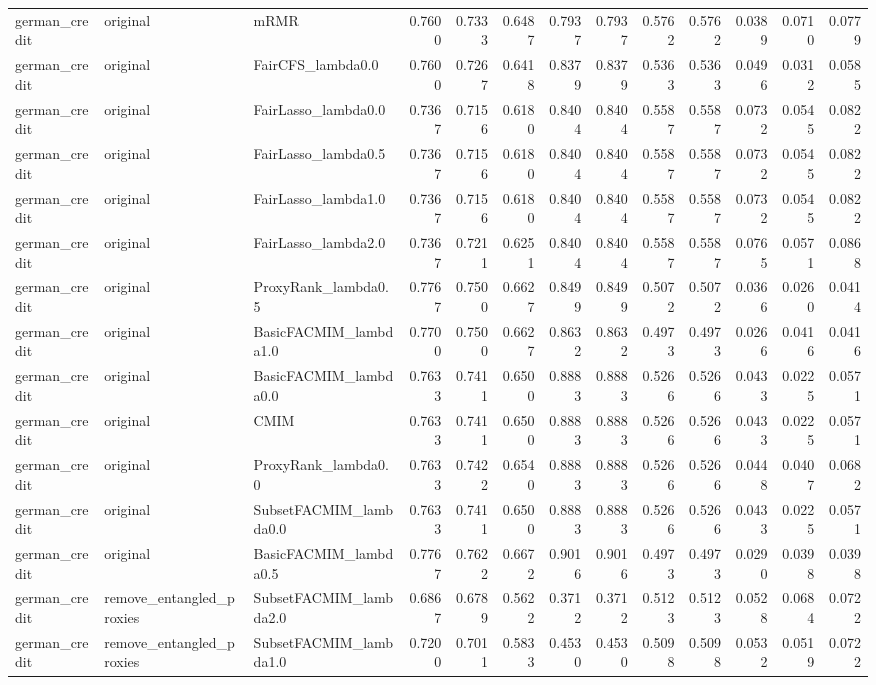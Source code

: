 \begin{tabular}{lllrrrrrrrrrr}
german_credit & original & mRMR & 0.7600 & 0.7333 & 0.6487 & 0.7937 & 0.7937 & 0.5762 & 0.5762 & 0.0389 & 0.0710 & 0.0779 \\
german_credit & original & FairCFS_lambda0.0 & 0.7600 & 0.7267 & 0.6418 & 0.8379 & 0.8379 & 0.5363 & 0.5363 & 0.0496 & 0.0312 & 0.0585 \\
german_credit & original & FairLasso_lambda0.0 & 0.7367 & 0.7156 & 0.6180 & 0.8404 & 0.8404 & 0.5587 & 0.5587 & 0.0732 & 0.0545 & 0.0822 \\
german_credit & original & FairLasso_lambda0.5 & 0.7367 & 0.7156 & 0.6180 & 0.8404 & 0.8404 & 0.5587 & 0.5587 & 0.0732 & 0.0545 & 0.0822 \\
german_credit & original & FairLasso_lambda1.0 & 0.7367 & 0.7156 & 0.6180 & 0.8404 & 0.8404 & 0.5587 & 0.5587 & 0.0732 & 0.0545 & 0.0822 \\
german_credit & original & FairLasso_lambda2.0 & 0.7367 & 0.7211 & 0.6251 & 0.8404 & 0.8404 & 0.5587 & 0.5587 & 0.0765 & 0.0571 & 0.0868 \\
german_credit & original & ProxyRank_lambda0.5 & 0.7767 & 0.7500 & 0.6627 & 0.8499 & 0.8499 & 0.5072 & 0.5072 & 0.0366 & 0.0260 & 0.0414 \\
german_credit & original & BasicFACMIM_lambda1.0 & 0.7700 & 0.7500 & 0.6627 & 0.8632 & 0.8632 & 0.4973 & 0.4973 & 0.0266 & 0.0416 & 0.0416 \\
german_credit & original & BasicFACMIM_lambda0.0 & 0.7633 & 0.7411 & 0.6500 & 0.8883 & 0.8883 & 0.5266 & 0.5266 & 0.0433 & 0.0225 & 0.0571 \\
german_credit & original & CMIM & 0.7633 & 0.7411 & 0.6500 & 0.8883 & 0.8883 & 0.5266 & 0.5266 & 0.0433 & 0.0225 & 0.0571 \\
german_credit & original & ProxyRank_lambda0.0 & 0.7633 & 0.7422 & 0.6540 & 0.8883 & 0.8883 & 0.5266 & 0.5266 & 0.0448 & 0.0407 & 0.0682 \\
german_credit & original & SubsetFACMIM_lambda0.0 & 0.7633 & 0.7411 & 0.6500 & 0.8883 & 0.8883 & 0.5266 & 0.5266 & 0.0433 & 0.0225 & 0.0571 \\
german_credit & original & BasicFACMIM_lambda0.5 & 0.7767 & 0.7622 & 0.6672 & 0.9016 & 0.9016 & 0.4973 & 0.4973 & 0.0290 & 0.0398 & 0.0398 \\
german_credit & remove_entangled_proxies & SubsetFACMIM_lambda2.0 & 0.6867 & 0.6789 & 0.5622 & 0.3712 & 0.3712 & 0.5123 & 0.5123 & 0.0528 & 0.0684 & 0.0722 \\
german_credit & remove_entangled_proxies & SubsetFACMIM_lambda1.0 & 0.7200 & 0.7011 & 0.5833 & 0.4530 & 0.4530 & 0.5098 & 0.5098 & 0.0532 & 0.0519 & 0.0722 \\

\end{tabular}

